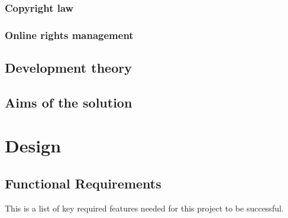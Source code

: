 \documentclass[12pt]{article}
\begin{document}
\subsubsection{Copyright law}
\subsubsection{Online rights management}

\subsection{Development theory}

\subsection{Aims of the solution}

\section{Design}

\subsection{Functional Requirements}
This is a list of key required features needed for this project to be successful.
\end{document}
